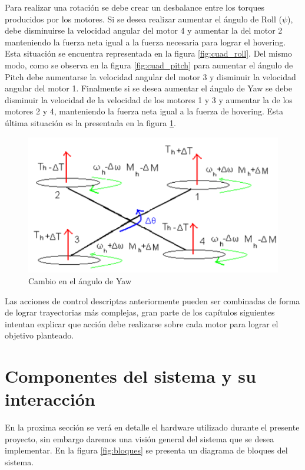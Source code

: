 \documentclass[main]{subfiles}
\begin{document}
Para realizar una rotaci\'on se debe crear un desbalance entre los torques producidos por los motores. Si se desea realizar aumentar el \'angulo de Roll ($\psi$), debe disminuirse la velocidad  angular del motor 4 y aumentar la del motor 2 manteniendo la fuerza neta igual a la fuerza necesaria para lograr el hovering. Esta situaci\'on se encuentra representada en la figura \ref{fig:cuad_roll}. Del mismo modo, como se observa en la figura \ref{fig:cuad_pitch} para aumentar el \'angulo de Pitch debe aumentarse la velocidad angular del motor 3 y disminuir la velocidad angular del motor 1. Finalmente si se desea aumentar el \'angulo de Yaw se debe disminuir la velocidad de la velocidad de los motores 1 y 3 y aumentar la de los motores 2 y 4, manteniendo la fuerza neta igual a la fuerza de hovering. Esta \'ultima situaci\'on es la presentada en la figura \ref{fig:quad_theta}.



\begin{figure}[!h]
\centering
\includegraphics[scale=0.5]{./pics_general/quad_theta.pdf}
\caption{Cambio en el \'angulo de Yaw}
\label{fig:quad_theta}
\end{figure}
Las acciones de control descriptas anteriormente pueden ser combinadas de forma de lograr trayectorias m\'as complejas, gran parte de los cap\'itulos siguientes intentan explicar que acci\'on debe realizarse sobre cada motor para lograr el objetivo planteado.

\section{Componentes del sistema y su interacci\'on}

En la proxima secci\'on se ver\'a en detalle el hardware utilizado durante el presente proyecto, sin embargo daremos una visi\'on general del sistema que se desea implementar. En la figura \ref{fig:bloques} se presenta un diagrama de bloques del sistema.\\
\end{document}
